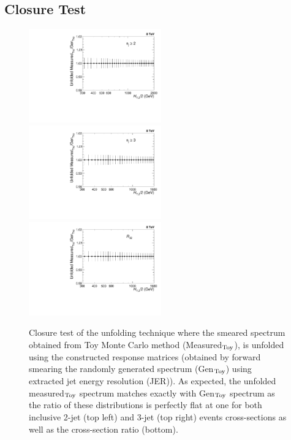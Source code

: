 \subsection{Closure Test}
\begin{figure}[!ht]
 \begin{center}
 \hspace*{-3mm}\includegraphics[width=0.51\textwidth]{Plots_HT_2_150/Ratio_Unfolding_NLO_2_funcI.pdf}%
 ~~\includegraphics[width=0.51\textwidth]{Plots_HT_2_150/Ratio_Unfolding_NLO_3_funcI.pdf}\\
 \includegraphics[width=0.51\textwidth]{Plots_HT_2_150/Ratio_Unfolding_NLO_Ratio_32_funcI.pdf}
 \caption[Closure test of the unfolding technique .]{Closure test of the unfolding technique where the smeared spectrum obtained from Toy Monte Carlo method (Measured$_{\rm Toy}$), is unfolded using the constructed response matrices (obtained by forward smearing the randomly generated spectrum (Gen$_{\rm Toy}$) using extracted jet energy resolution (JER)). As expected, the unfolded measured$_{\rm Toy}$ spectrum matches exactly with Gen$_{\rm Toy}$ spectrum as the ratio of these distributions is perfectly flat at one for both inclusive 2-jet (top left) and 3-jet (top right) events cross-sections as well as the cross-section ratio \ratio (bottom).}
 \label{fig:unfolded_smeared}
 \end{center}
\end{figure}

